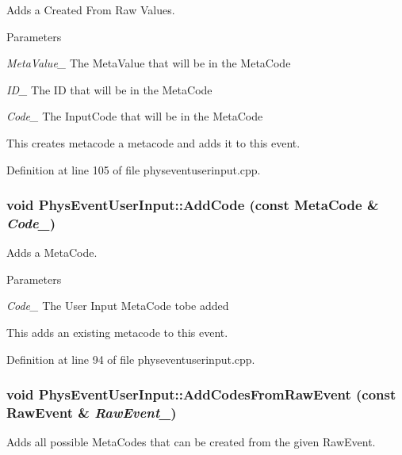 Adds a Created From Raw Values. 


\begin{DoxyParams}{Parameters}
\item[{\em MetaValue\_\-}]The MetaValue that will be in the MetaCode \item[{\em ID\_\-}]The ID that will be in the MetaCode \item[{\em Code\_\-}]The InputCode that will be in the MetaCode\end{DoxyParams}
This creates metacode a metacode and adds it to this event. 

Definition at line 105 of file physeventuserinput.cpp.

\hypertarget{classPhysEventUserInput_a4f5b94c64cd08c15b480e441d25a385d}{
\subsubsection[{AddCode}]{\setlength{\rightskip}{0pt plus 5cm}void PhysEventUserInput::AddCode (const {\bf MetaCode} \& {\em Code\_\-})}}
\label{dc/d0e/classPhysEventUserInput_a4f5b94c64cd08c15b480e441d25a385d}


Adds a MetaCode. 


\begin{DoxyParams}{Parameters}
\item[{\em Code\_\-}]The User Input MetaCode tobe added\end{DoxyParams}
This adds an existing metacode to this event. 

Definition at line 94 of file physeventuserinput.cpp.

\hypertarget{classPhysEventUserInput_a9e42f42f9a4a42f792e5cf95856669c0}{
\subsubsection[{AddCodesFromRawEvent}]{\setlength{\rightskip}{0pt plus 5cm}void PhysEventUserInput::AddCodesFromRawEvent (const RawEvent \& {\em RawEvent\_\-})}}
\label{dc/d0e/classPhysEventUserInput_a9e42f42f9a4a42f792e5cf95856669c0}


Adds all possible MetaCodes that can be created from the given RawEvent. 


